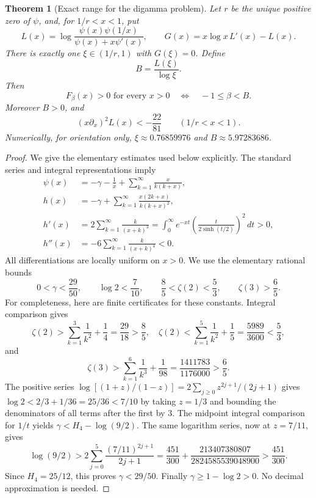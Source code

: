 \documentclass[11pt,a4paper]{article}
\newtheorem{theorem}{Theorem}[section]
\theoremstyle{definition}
\theoremstyle{remark}
\numberwithin{equation}{section}
\begin{document}
\begin{theorem}[Exact range for the digamma problem]
\label{p2:thm:qln-op3}
Let $r$ be the unique positive zero of $\psi$, and, for $1/r<x<1$, put
\[
 L(x)=\log\frac{\psi(x)\psi(1/x)}{\psi(x)+x\psi'(x)},\qquad
 G(x)=x\log x\,L'(x)-L(x).
\]
There is exactly one $\xi\in(1/r,1)$ with $G(\xi)=0$.  Define
\[
 B=\frac{L(\xi)}{\log\xi}.
\]
Then
\[
 \boxed{\quad F_\beta(x)>0\text{ for every }x>0
                 \quad\Longleftrightarrow\quad -1\le\beta<B.\quad}
\]
Moreover $B>0$, and
\[
 (x\partial_x)^2 L(x)<-\frac{22}{81}\qquad(1/r<x<1).
\]
Numerically, for orientation only,
$\xi\approx0.76859976$ and $B\approx5.97283686$.
\end{theorem}

\begin{proof}
We give the elementary estimates used below explicitly.  The standard series
and integral representations imply
\begin{align}
 \psi(x)&=-\gamma-\frac1x+
       \sum_{k=1}^{\infty}\frac{x}{k(k+x)},\label{p2:eq:qln-psi-series}\\
 h(x)&=-\gamma+\sum_{k=1}^{\infty}
       \frac{x(2k+x)}{k(k+x)^2},\label{p2:eq:qln-h-series}\\
 h'(x)&=2\sum_{k=1}^{\infty}\frac{k}{(x+k)^3}
       =\int_0^\infty e^{-xt}
         \left(\frac{t}{2\sinh(t/2)}\right)^2\,dt>0,\label{p2:eq:qln-hprime}\\
 h''(x)&=-6\sum_{k=1}^{\infty}\frac{k}{(x+k)^4}<0.
\end{align}
All differentiations are locally uniform on $x>0$.  We use the elementary
rational bounds
\[
 0<\gamma<\frac{29}{50},\qquad \log2<\frac7{10},\qquad
 \frac85<\zeta(2)<\frac53,\qquad \zeta(3)>\frac65.
\]
For completeness, here are finite certificates for these constants.
Integral comparison gives
\[
 \zeta(2)>\sum_{k=1}^3\frac1{k^2}+\frac14=\frac{29}{18}>\frac85,
 \quad
 \zeta(2)<\sum_{k=1}^5\frac1{k^2}+\frac15=\frac{5989}{3600}<\frac53,
\]
and
\[
 \zeta(3)>\sum_{k=1}^6\frac1{k^3}+\frac1{98}
 =\frac{1411783}{1176000}>\frac65.
\]
The positive series $\log[(1+z)/(1-z)]=2\sum_{j\ge0}z^{2j+1}/(2j+1)$
gives $\log2<2/3+1/36=25/36<7/10$ by taking $z=1/3$
and bounding the denominators of all terms after the first by $3$.
The midpoint integral comparison for $1/t$ yields
$\gamma<H_4-\log(9/2)$.  The same logarithm series, now at $z=7/11$, gives
\[
 \log(9/2)>2\sum_{j=0}^5\frac{(7/11)^{2j+1}}{2j+1}
 =\frac{451}{300}+\frac{213407380807}{2824585539048900}
 >\frac{451}{300}.
\]
Since $H_4=25/12$, this proves $\gamma<29/50$.
Finally $\gamma\ge1-\log2>0$.  No decimal approximation is needed.

\end{proof}
\end{document}
